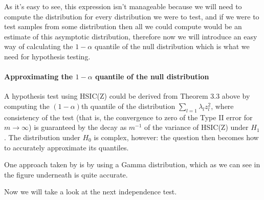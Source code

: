 As it's easy to see, this expression isn't manageable because we will need to compute the distribution for every distribution we were to test, and if we were to test samples from some distribution then all we could compute would be an estimate of this asymptotic distribution, therefore now we will introduce an easy way of calculating the $1-\alpha$ quantile of the null distribution which is what we need for hypothesis testing.

\paragraph{Approximating the $1-\alpha$ quantile of the null distribution}

A hypothesis test using HSIC(Z)
could be derived from Theorem 3.3 above by computing the $(1 − \alpha)$th quantile of the distribution  $\sum_{l=1} \lambda_{l}z_{l}^{2}$,
where consistency of the test (that is, the convergence to zero of the Type II error for $m \rightarrow \infty$) is
guaranteed by the decay as $m^{-1}$ of the variance of HSIC(Z) under $H_{1}$ . The distribution under $H_{0}$
is complex, however: the question then becomes how to accurately approximate its quantiles.

One approach taken by \cite{HSICdistribution} is by using a Gamma distribution, which as we can see in the figure underneath is quite accurate.

Now we will take a look at the next independence test.
